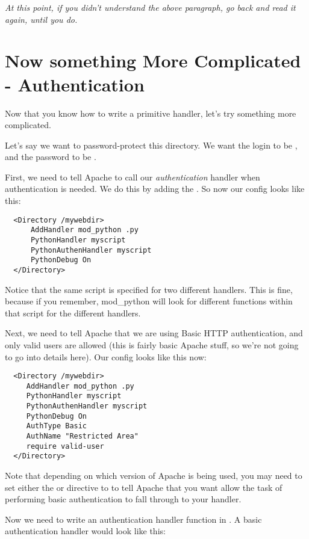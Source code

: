 \emph{At this point, if you didn't understand the above paragraph, go
  back and read it again, until you do.}

\section{Now something More Complicated - Authentication\label{tut-more-complicated}}

Now that you know how to write a primitive handler, let's try
something more complicated.

Let's say we want to password-protect this directory. We want the
login to be , and the password to be .

First, we need to tell Apache to call our \emph{authentication}
handler when authentication is needed. We do this by adding the
. So now our config looks like this:

\begin{verbatim}
  <Directory /mywebdir>
      AddHandler mod_python .py
      PythonHandler myscript
      PythonAuthenHandler myscript
      PythonDebug On
  </Directory>
\end{verbatim}

Notice that the same script is specified for two different
handlers. This is fine, because if you remember, mod_python will look
for different functions within that script for the different handlers.

Next, we need to tell Apache that we are using Basic HTTP
authentication, and only valid users are allowed (this is fairly basic
Apache stuff, so we're not going to go into details here). Our config
looks like this now:

\begin{verbatim}
  <Directory /mywebdir>
     AddHandler mod_python .py
     PythonHandler myscript
     PythonAuthenHandler myscript
     PythonDebug On
     AuthType Basic
     AuthName "Restricted Area"
     require valid-user
  </Directory>
\end{verbatim}          

Note that depending on which version of Apache is being used, you may need
to set either the  or 
directive to  to tell Apache that you want allow the task of
performing basic authentication to fall through to your handler.

Now we need to write an authentication handler function in
. A basic authentication handler would look like
this:

